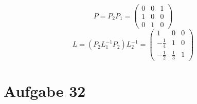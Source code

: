 \documentclass[10pt,a4paper]{article}
\begin{document}
\begin{equation}
  P = P_{2}P_{1} = \begin{pmatrix}
    0 & 0 & 1\\
    1 & 0 & 0\\
    0 & 1 & 0
  \end{pmatrix}
\end{equation}
\begin{equation}
  L = (P_{2} L_{1}^{-1} P_{2}) L_{2}^{-1} = \begin{pmatrix}
    1 & 0 & 0\\
    -\frac{1}{4} & 1 & 0\\
    -\frac{1}{2} & \frac{1}{3} & 1
  \end{pmatrix}
\end{equation}

\section{Aufgabe 32}
\end{document}
